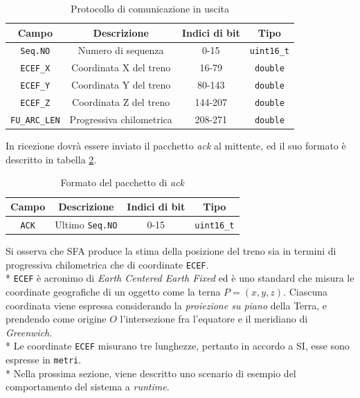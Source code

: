 \begin{table}[h]
	\centering
	\begin{tabular}{|c|c|c|c|}
		\hline 
		\textbf{Campo} & \textbf{Descrizione} & \textbf{Indici di bit} & \textbf{Tipo} \\ 
		\hline
		\texttt{Seq.NO} & Numero di sequenza & 0-15 & \texttt{uint16\_t} \\ 
		\hline 
		\texttt{ECEF\_X} & Coordinata X del treno & 16-79 & \texttt{double} \\ 
		\hline 
		\texttt{ECEF\_Y} & Coordinata Y del treno & 80-143 & \texttt{double} \\ 
		\hline 
		\texttt{ECEF\_Z} & Coordinata Z del treno & 144-207 & \texttt{double} \\ 
		\hline 
		\texttt{FU\_ARC\_LEN} & Progressiva chilometrica & 208-271 & \texttt{double} \\ 
		\hline 
	\end{tabular} 
\caption{Protocollo di comunicazione in uscita}
\label{tab:protoout}
\end{table}
In ricezione dovr\`a essere inviato il pacchetto \emph{ack} al mittente, ed il suo formato \`e descritto in tabella \ref{tab:ack}.
\begin{table}[h]
	\centering
	\begin{tabular}{|c|c|c|c|}
	\hline 
	\textbf{Campo} & \textbf{Descrizione} & \textbf{Indici di bit} & \textbf{Tipo} \\ 
	\hline
	\texttt{ACK} & Ultimo \texttt{Seq.NO} & 0-15 & \texttt{uint16\_t} \\ 
	\hline
\end{tabular}
\caption{Formato del pacchetto di \emph{ack}}
\label{tab:ack}
\end{table}
Si osserva che SFA produce la stima della posizione del treno sia in termini di progressiva chilometrica che di coordinate \texttt{ECEF}.\\*
\texttt{ECEF} \`e acronimo di \emph{Earth Centered Earth Fixed} ed \`e uno standard che misura le coordinate geografiche di un oggetto come la terna $ P = (x,y,z)$. Ciascuna coordinata viene espressa considerando la \emph{proiezione su piano} della Terra, e prendendo come origine $O$ l'intersezione fra l'equatore e il meridiano di \emph{Greenwich}.\\*
Le coordinate \texttt{ECEF} misurano tre lunghezze, pertanto in accordo a SI, esse sono espresse in \texttt{metri}.\\*
Nella prossima sezione, viene descritto uno scenario di esempio del comportamento del sistema a \emph{runtime}.\newpage
